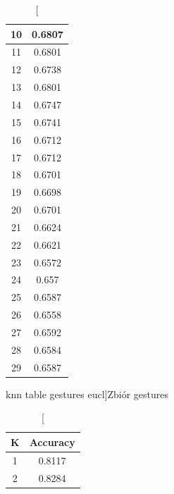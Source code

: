 \documentclass{classrep}
\begin{document}
{{{\begin{table}[!htbp]
\begin{minipage}{.3\textwidth}
\begin{tabular}{|c|c|}
                            10 & 0.6807 \\ \hline
                            11 & 0.6801 \\ \hline
                            12 & 0.6738 \\ \hline
                            13 & 0.6801 \\ \hline
                            14 & 0.6747 \\ \hline
                            15 & 0.6741 \\ \hline
                            16 & 0.6712 \\ \hline
                            17 & 0.6712 \\ \hline
                            18 & 0.6701 \\ \hline
                            19 & 0.6698 \\ \hline
                            20 & 0.6701 \\ \hline
                            21 & 0.6624 \\ \hline
                            22 & 0.6621 \\ \hline
                            23 & 0.6572 \\ \hline
                            24 & 0.657 \\ \hline
                            25 & 0.6587 \\ \hline
                            26 & 0.6558 \\ \hline
                            27 & 0.6592 \\ \hline
                            28 & 0.6584 \\ \hline
                            29 & 0.6587 \\ \hline
                        \end{tabular}
                        \caption
                        [knn table gestures eucl]{Zbiór gestures}
                        \label{knn_table_gestures_eucl}
                    \end{minipage}
                    \hfill
                    \begin{minipage}{.3\textwidth}
                        \centering
                        \begin{tabular}{|c|c|}
                            \hline
                            K & Accuracy \\ \hline
                            1 & 0.8117 \\ \hline
                            2 & 0.8284 \\ \hline

\end{tabular}
\end{minipage}
\end{table}}}}
\end{document}
